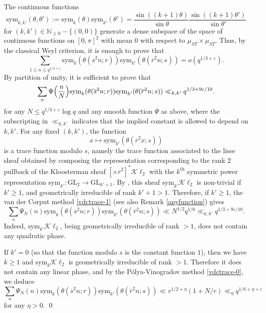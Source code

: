 \documentclass[12pt,a4paper,reqno]{amsart}
\numberwithin{equation}{section}
\newcommand{\Kl}{\mathcal{K}\ell}
\theoremstyle{plain}
\theoremstyle{definition}
\newcommand\eps{\varepsilon}
\newcommand\ov{\overline}
\newcommand\Nn{\mathbb{N}}
\newcommand{\ra}{\rightarrow}
\newcommand{\GL}{\mathrm{GL}}
\begin{document}
\proof The continuous
functions 
$$
\mathrm{sym}_{k,k'}(\theta,\theta'):=\mathrm{sym}_k(\theta)
\mathrm{sym}_{k'}(\theta')=\frac{\sin((k+1)\theta)}{\sin\theta}\frac{\sin((k+1)\theta')}{\sin\theta'}
$$
for $(k,k')\in\Nn_{\geq 0}-\{(0,0)\}$ generate a dense subspace of the
space of continuous functions on $[0,\pi]^2$ with mean $0$ with
respect to $\mu_{ST}\times\mu_{ST}$. Thus, by the classical Weyl
criterion, it is enough to prove that
$$
\sum_{1\leq n\leq q^{1/3+\eps}}\mathrm{sym}_k(\theta(\ov
s^2n;r))\mathrm{sym}_{k'}(\theta(\ov r^2n;s))=o(q^{1/3+\eps}).
$$
By partition of unity, it is sufficient to prove that
\begin{equation}\label{STbound}
  \sum_{n}\Psi\Bigl(\frac{n}{N}\Bigr)\mathrm{sym}_k(\theta(\ov s^2n;r))
  \mathrm{sym}_{k'}(\theta(\ov r^2n;s))\ll_{k,k'} q^{1/3+9\eps/10}.
\end{equation}
for any $N\leq q^{1/3+\eps}\log q$ and any smooth function $\Psi$ as
above, where the subscripting in $\ll_{k,k'}$ indicates that the implied constant is allowed to depend on $k,k'$.  For any fixed $(k,k')$, the function
$$
x\mapsto \mathrm{sym}_{k'}(\theta(\ov r^2x;s))
$$
is a trace function modulo $s$, namely the trace function associated
to the lisse sheaf obtained by composing the representation
corresponding to the rank $2$ pullback of the Kloosterman sheaf
$[\times \ov r^2]^*\Kl_2$ with the $k^{\operatorname{th}}$ symmetric power
representation $\mathrm{sym}_{k'}:\GL_2\ra \GL_{k'+1}$. By \cite{GKM},
this sheaf $\mathrm{sym}_{k'}\Kl_2$ is non-trivial if $k'\geq 1$, and
geometrically irreducible of rank $k'+1>1$. Therefore, if $k'\geq 1$,
the van der Corput method \eqref{vdctrace-1} (see also Remark
\ref{anyfunction}) gives
$$
\sum_{n}\Psi_N(n)\mathrm{sym}_k(\theta(\ov
s^2n;r))\mathrm{sym}_{k'}(\theta(\ov r^2n;s))\ll
N^{1/2}q^{1/6}\ll_{k,k'} q^{1/3+9\eps/10}.
$$
Indeed, $\mathrm{sym}_{k'}\Kl_2$, being geometrically irreducible of
rank $>1$, does not contain any quadratic phase. 
\par
If $k'=0$ (so that the function modulo $s$ is the constant function
$1$), then we have $k\geq 1$ and $\mathrm{sym}_{k}\Kl_2$ is
geometrically irreducible of rank $>1$. Therefore it does not contain
any linear phase, and by the P\'olya-Vinogradov method
\eqref{vdctrace-0}, we deduce
$$
\sum_{n}\Psi_N(n)\mathrm{sym}_k(\theta(\ov
s^2n;r))\mathrm{sym}_{k'}(\theta(\ov r^2n;s))\ll
r^{1/2+\eta}(1+N/r)\ll_\eta q^{1/6+\eta+\eps}
$$
for any $\eta>0$.
\qed


\end{document}
